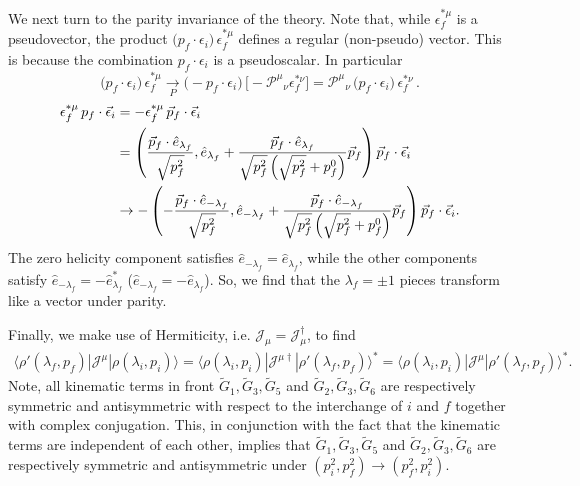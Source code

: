 {\mh 
We next turn to the parity invariance of the theory. Note that, while $\epsilon_f^{*\mu}$ is a pseudovector, the product $\big ( p_f\cdot {\epsilon}_i \big ) \, \epsilon_f^{*\mu}$ defines a regular (non-pseudo) vector. This is because the combination $ p_f\cdot \epsilon_i$ is a pseudoscalar. %
In particular
\begin{equation}
\big ( p_f\cdot {\epsilon}_i \big ) \, \epsilon_f^{*\mu} \underset{P}{\longrightarrow} \big ( \! - p_f\cdot {\epsilon}_i \big ) \, \Big [ \! - {\mathcal P^\mu}_\nu \epsilon_f^{*\nu} \Big ] = {\mathcal P^\mu}_\nu \, \big ( p_f\cdot {\epsilon}_i \big ) \, \epsilon_f^{*\nu}   \,.
\end{equation}}
{\raul \begin{align}
\epsilon_f^{*\mu}\, p_f\cdot \vec{\epsilon}_i
&=
-\epsilon_f^{*\mu}\, \vec{p}_f \cdot\vec{\epsilon}_i\nonumber\\
&=
\left(\frac{\vec{p}_f\cdot\hat{e}_{\lambda_f}}{\sqrt{p^2_f}},\hat{e}_{\lambda_f}+\frac{\vec{p}_f\cdot\hat{e}_{\lambda_f}}{\sqrt{p^2_f}\left(\sqrt{p^2_f}+p^0_f\right)}\vec{p}_f\right)
\vec{p}_f \cdot\vec{\epsilon}_i
\nonumber\\
&\to
-
\left(-\frac{\vec{p}_f\cdot\hat{e}_{-\lambda_f}}{\sqrt{p^2_f}},\hat{e}_{-\lambda_f}+\frac{\vec{p}_f\cdot\hat{e}_{-\lambda_f}}{\sqrt{p^2_f}\left(\sqrt{p^2_f}+p^0_f\right)}\vec{p}_f\right)
\vec{p}_f \cdot \vec{\epsilon}_i.
\end{align}}
The zero helicity component satisfies $\hat{e}_{-\lambda_f}=\hat{e}_{\lambda_f}$, while the other components satisfy {\mh $\hat{e}_{-\lambda_f}=-\hat{e}^*_{\lambda_f}$} ({\raul $\hat{e}_{-\lambda_f}=-\hat{e}_{\lambda_f}$}). So, we find that the $\lambda_f=\pm 1$ pieces transform like a vector under parity.  {}

Finally, we make use of Hermiticity, i.e. ${\mathcal{J}}_{\mu}={\mathcal{J}}^\dag_{\mu}$, to find
\begin{align}
\langle\rho'(\lambda_f,p_f)|{\mathcal{J}}^{\mu}|\rho(\lambda_i,p_i)\rangle
=
\langle\rho(\lambda_i,p_i)|{\mathcal{J}}^{\mu\dag}|\rho'(\lambda_f,p_f)\rangle^*
=
\langle\rho(\lambda_i,p_i)|{\mathcal{J}}^{\mu}|\rho'(\lambda_f,p_f)\rangle^*.
\end{align}
Note, all kinematic terms in front $\widetilde{G}_1,\widetilde{G}_3,\widetilde{G}_5$ and $\widetilde{G}_2,\widetilde{G}_3,\widetilde{G}_6$ are respectively symmetric and antisymmetric with respect to the interchange of $i$ and $f$ together with complex conjugation. This, in conjunction with the fact that the kinematic terms are independent of each other, implies that $\widetilde{G}_1,\widetilde{G}_3,\widetilde{G}_5$ and $\widetilde{G}_2,\widetilde{G}_3,\widetilde{G}_6$ are respectively symmetric and antisymmetric under $(p_i^2, p_f^2) \to (p_f^2, p_i^2) $.  {}

